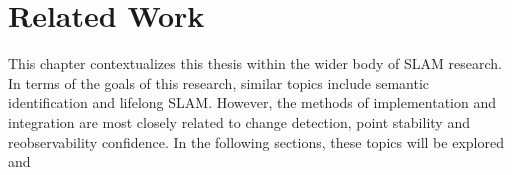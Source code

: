 \section{Related Work}
\label{sec:related_work}

This chapter contextualizes this thesis within the wider body of SLAM research. In terms of the goals of this research, similar topics include semantic identification and lifelong SLAM. However, the methods of implementation and integration are most closely related to change detection, point stability and reobservability confidence. In the following sections, these topics will be explored and 
% 
